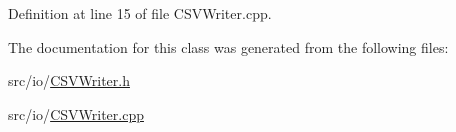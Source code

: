 Definition at line 15 of file C\-S\-V\-Writer.\-cpp.



The documentation for this class was generated from the following files\-:\begin{DoxyCompactItemize}
\item 
src/io/\hyperlink{_c_s_v_writer_8h}{C\-S\-V\-Writer.\-h}\item 
src/io/\hyperlink{_c_s_v_writer_8cpp}{C\-S\-V\-Writer.\-cpp}\end{DoxyCompactItemize}
